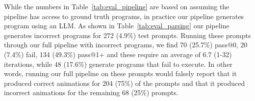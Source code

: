 While the numbers in Table~\ref{tab:eval_pipeline} are based on
assuming the pipeline has access to ground truth \dslname{} programs,
in practice our pipeline generates \dslname{} program
using an LLM.
%
As shown in Table~\ref{tab:eval_parsing} our pipeline generates
incorrect \dslname{} programs for 272 (4.9\%) test prompts. Running
these prompts through our full pipeline with incorrect \dslname{}
programs, we find 70 (25.7\%) pass@0, 20 (7.4\%) fail, 134 (49.3\%)
pass@1+ and these require an average of 6.7 (1-32) iterations, while
48 (17.6\%) generate \dslname{} programs that fail to execute.
%
In other words, running our full pipeline on these prompts would
falsely report that it produced correct animations for 204 (75\%) of
the prompts and that it produced incorrect animations for the
remaining 68 (25\%) prompts.







